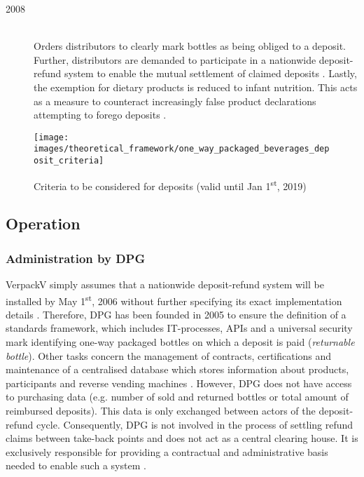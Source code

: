 \begin{description}
	\item[2008]
	\hfill \\
	Orders distributors to clearly mark bottles as being obliged to a deposit. Further, distributors are demanded to participate in a nationwide deposit-refund system to enable the mutual settlement of claimed deposits \cite[§~9]{verpackV2008}. Lastly, the exemption for dietary products is reduced to infant nutrition. This acts as a measure to counteract increasingly false product declarations attempting to forego deposits \cite[pp.~531]{verpackV2008} \cite[p.~171]{Flanderka/Stroetmann2009}.
\end{description}


\begin{figure}[hbt]
	\centering
	\texttt{[image: images/theoretical\_framework/one\_way\_packaged\_beverages\_deposit\_criteria]}
	\caption{Criteria to be considered for deposits (valid until Jan 1\textsuperscript{st}, 2019) \cite[p.~9]{Hartlep2011Recycling}}
	\label{fig:depositCriteria}
\end{figure}

\FloatBarrier

\subsection{Operation}

\subsubsection{Administration by \acl{DPG}}
\ac{VerpackV} simply assumes that a nationwide deposit-refund system will be installed by May 1\textsuperscript{st}, 2006 without further specifying its exact implementation details \cite[Art.~2]{verpackV2005} \cite[§~9]{verpackV2008}. Therefore, \ac{DPG} has been founded in 2005 to ensure the definition of a standards framework, which includes IT-processes, APIs and a universal security mark identifying one-way packaged bottles on which a deposit is paid (\textit{returnable bottle}). Other tasks concern the management of contracts, certifications and maintenance of a centralised database which stores information about products, participants and reverse vending machines \cite[pp.~13]{Hartlep2011Recycling}. However, \ac{DPG} does not have access to purchasing data (e.g. number of sold and returned bottles or total amount of reimbursed deposits). This data is only exchanged between actors of the deposit-refund cycle. Consequently, \ac{DPG} is not involved in the process of settling refund claims between take-back points and does not act as a central clearing house. It is exclusively responsible for providing a contractual and administrative basis needed to enable such a system \cite[p.~14]{Hartlep2011Recycling}.

